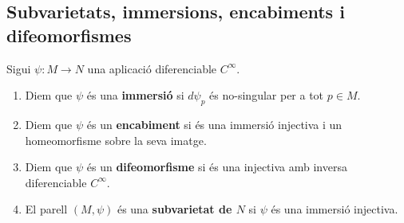 \subsection{Subvarietats, immersions, encabiments i difeomorfismes}
\begin{defi}
    Sigui $\psi:M\to N$ una aplicació diferenciable {\color{blue} $C^\infty$}.
    \begin{enumerate}
        \item Diem que $\psi$ és una \textbf{immersió} si $d\psi_p$ és no-singular per a tot $p\in M$.
        \item Diem que $\psi$ és un \textbf{encabiment} si és una immersió injectiva i un homeomorfisme sobre la seva imatge.
        \item Diem que $\psi$ és un \textbf{difeomorfisme} si és una injectiva amb inversa diferenciable {\color{blue} $C^\infty$}.
        \item El parell $(M, \psi)$ és una \textbf{subvarietat de $N$} si $\psi$ és una immersió injectiva.
    \end{enumerate}
\end{defi}



\newpage